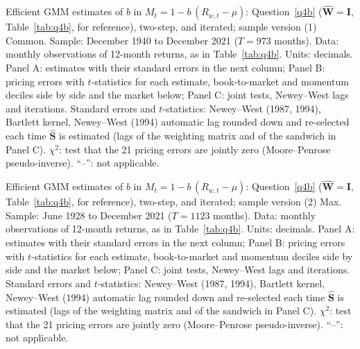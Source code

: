 \documentclass[11pt]{article}
\begin{document}
\begin{table}[p]
  \centering
  \footnotesize
  \renewcommand{\arraystretch}{0.9}
  \captionsetup{font=footnotesize}
  
  \caption{Efficient GMM estimates of $b$ in $M_t = 1 - b\,(R_{w,t} - \mu)$: Question~\ref{q4b}
    ($\hat{\mathbf{W}} = \mathbf{I}$, Table~\ref{tab:q4b}, for reference), two-step, and iterated; sample
    version (1) Common. Sample: December 1940 to December 2021 ($T = 973$ months). Data: monthly observations of 12-month returns, as in
    Table~\ref{tab:q4b}. Units: decimals. Panel A: estimates with their standard errors in the next column;
    Panel B: pricing errors with $t$-statistics for each estimate, book-to-market and momentum deciles side by
    side and the market below; Panel C: joint tests, Newey--West lags and iterations. Standard errors and
    $t$-statistics: Newey--West (1987, 1994), Bartlett kernel, Newey--West (1994) automatic lag rounded down
    and re-selected each time $\hat{\mathbf{S}}$ is estimated (lags of the weighting matrix and of the
    sandwich in Panel C). $\chi^2$: test that the 21 pricing errors are jointly zero (Moore--Penrose
    pseudo-inverse). ``--'': not applicable.}
  \label{tab:q4c}
\end{table}

\begin{table}[p]
  \centering
  \footnotesize
  \renewcommand{\arraystretch}{0.9}
  \captionsetup{font=footnotesize}
  
  \caption{Efficient GMM estimates of $b$ in $M_t = 1 - b\,(R_{w,t} - \mu)$: Question~\ref{q4b}
    ($\hat{\mathbf{W}} = \mathbf{I}$, Table~\ref{tab:q4b}, for reference), two-step, and iterated; sample
    version (2) Max. Sample: June 1928 to December 2021 ($T = 1123$ months). Data: monthly observations of 12-month returns, as in
    Table~\ref{tab:q4b}. Units: decimals. Panel A: estimates with their standard errors in the next column;
    Panel B: pricing errors with $t$-statistics for each estimate, book-to-market and momentum deciles side by
    side and the market below; Panel C: joint tests, Newey--West lags and iterations. Standard errors and
    $t$-statistics: Newey--West (1987, 1994), Bartlett kernel, Newey--West (1994) automatic lag rounded down
    and re-selected each time $\hat{\mathbf{S}}$ is estimated (lags of the weighting matrix and of the
    sandwich in Panel C). $\chi^2$: test that the 21 pricing errors are jointly zero (Moore--Penrose
    pseudo-inverse). ``--'': not applicable.}
  \label{tab:q4c_max}
\end{table}
\end{document}
